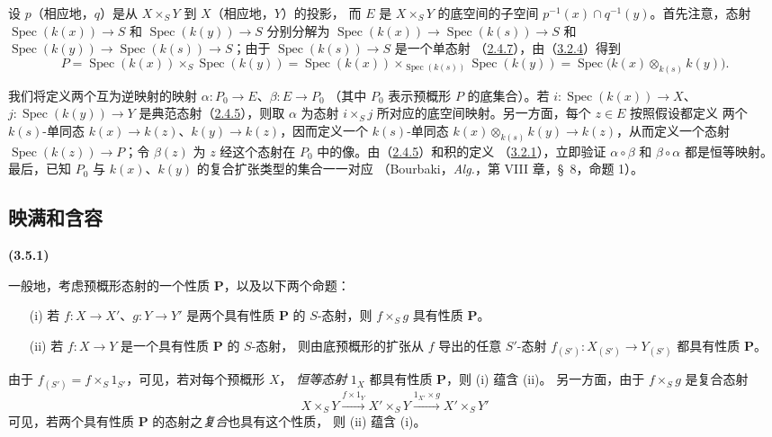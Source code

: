 \documentclass[UTF8,fontset=none,11pt,oneside,openany]{ctexbook}
\newenvironment{env}[1][]{%
  \par\medskip\noindent\textbf{(#1)}\ %
}{\par}
\newcommand{\oldpage}[2][]{%
  \hypertarget{ega-source-page-#1-#2}{}%
  \marginnote{\scriptsize\textbf{#1}~|~#2}\ignorespaces}
\let\EGAOriginalLabel\label
\renewcommand{\label}[1]{\phantomsection\EGAOriginalLabel{#1}}
\begin{document}
设 $p$（相应地，$q$）是从 $X\times_S Y$ 到 $X$（相应地，$Y$）的投影，
而 $E$ 是 $X\times_S Y$ 的底空间的子空间
$p^{-1}(x)\cap q^{-1}(y)$。首先注意，态射
$\operatorname{Spec}(k(x))\to S$ 和 $\operatorname{Spec}(k(y))\to S$
分别分解为
$\operatorname{Spec}(k(x))\to\operatorname{Spec}(k(s))\to S$ 和
$\operatorname{Spec}(k(y))\to\operatorname{Spec}(k(s))\to S$；由于
$\operatorname{Spec}(k(s))\to S$ 是一个单态射
（\hyperref[I.2.4.7-fr]{2.4.7}），由（\hyperref[I.3.2.4-fr]{3.2.4}）得到
\label{I.3.4.9.tensor-product-fibre-fr}
\[
  P=\operatorname{Spec}(k(x))\times_S\operatorname{Spec}(k(y))
  =\operatorname{Spec}(k(x))\times_{\operatorname{Spec}(k(s))}
   \operatorname{Spec}(k(y))
  =\operatorname{Spec}\bigl(k(x)\otimes_{k(s)}k(y)\bigr).
\]

我们将定义两个互为逆映射的映射 $\alpha:P_0\to E$、$\beta:E\to P_0$
（其中 $P_0$ 表示预概形 $P$ 的底集合）。若
$i:\operatorname{Spec}(k(x))\to X$、$j:\operatorname{Spec}(k(y))\to Y$
是典范态射（\hyperref[I.2.4.5-fr]{2.4.5}），则取 $\alpha$ 为态射
$i\times_S j$ 所对应的底空间映射。另一方面，每个 $z\in E$ 按照假设都定义
两个 $k(s)$-单同态 $k(x)\to k(z)$、$k(y)\to k(z)$，因而定义一个
$k(s)$-单同态 $k(x)\otimes_{k(s)}k(y)\to k(z)$，从而定义一个态射
$\operatorname{Spec}(k(z))\to P$；令 $\beta(z)$ 为 $z$ 经这个态射在
$P_0$ 中的像。由（\hyperref[I.2.4.5-fr]{2.4.5}）和积的定义
（\hyperref[I.3.2.1-fr]{3.2.1}），立即验证 $\alpha\circ\beta$ 和
$\beta\circ\alpha$ 都是恒等映射。最后，已知 $P_0$ 与 $k(x)$、$k(y)$
的复合扩张类型的集合一一对应
（Bourbaki，\emph{Alg.}，第 VIII 章，\S~8，命题 1）。

\subsection{映满和含容}
\label{subsection:I.3.5-fr}

\begin{env}[3.5.1]
\label{I.3.5.1-fr}
一般地，考虑预概形态射的一个性质 $\mathbf{P}$，以及以下两个命题：
\begin{enumerate}
  \item[(i)] 若 $f:X\to X'$、$g:Y\to Y'$ 是两个具有性质
  $\mathbf{P}$ 的 $S$-态射，则 $f\times_S g$ 具有性质 $\mathbf{P}$。
  \item[(ii)] 若 $f:X\to Y$ 是一个具有性质 $\mathbf{P}$ 的 $S$-态射，
  则由底预概形的扩张从 $f$ 导出的任意 $S'$-态射
  $f_{(S')}:X_{(S')}\to Y_{(S')}$ 都具有性质 $\mathbf{P}$。
\end{enumerate}

\oldpage[I]{115}
由于 $f_{(S')}=f\times_S 1_{S'}$，可见，若对每个预概形 $X$，
\emph{恒等态射} $1_X$ 都具有性质 $\mathbf{P}$，则 (i) 蕴含 (ii)。
另一方面，由于 $f\times_S g$ 是复合态射
\label{I.3.5.1.product-composition-fr}
\[
  X\times_S Y\xrightarrow{f\times 1_Y}X'\times_S Y
  \xrightarrow{1_{X'}\times g}X'\times_S Y'
\]
可见，若两个具有性质 $\mathbf{P}$ 的态射之\emph{复合}也具有这个性质，
则 (ii) 蕴含 (i)。
\end{env}
\end{document}
